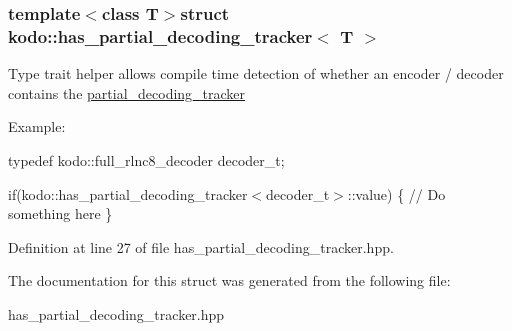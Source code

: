 \subsubsection*{template$<$class T$>$struct kodo\-::has\-\_\-partial\-\_\-decoding\-\_\-tracker$<$ T $>$}

Type trait helper allows compile time detection of whether an encoder / decoder contains the \hyperlink{classkodo_1_1partial__decoding__tracker}{partial\-\_\-decoding\-\_\-tracker}

Example\-:

typedef kodo\-::full\-\_\-rlnc8\-\_\-decoder decoder\-\_\-t;

if(kodo\-::has\-\_\-partial\-\_\-decoding\-\_\-tracker$<$decoder\-\_\-t$>$\-::value) \{ // Do something here \} 

Definition at line 27 of file has\-\_\-partial\-\_\-decoding\-\_\-tracker.\-hpp.



The documentation for this struct was generated from the following file\-:\begin{DoxyCompactItemize}
\item 
has\-\_\-partial\-\_\-decoding\-\_\-tracker.\-hpp\end{DoxyCompactItemize}
